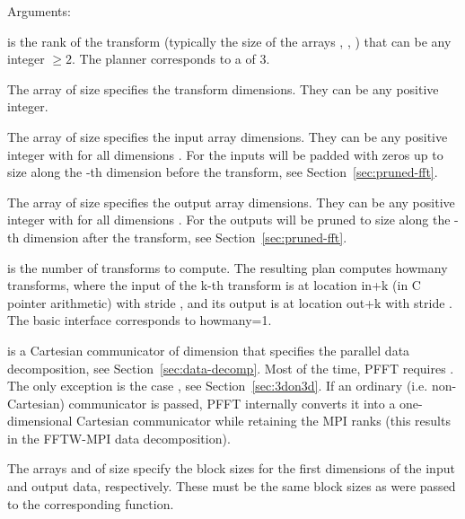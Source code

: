 Arguments:
\begin{compactitem}
  \item {} is the rank of the transform (typically the size of the arrays , , ) that can be any integer $\ge 2$.
        The  planner corresponds to a  of 3.
  \item The array  of size  specifies the transform dimensions. They can be any positive integer.
  \item The array  of size  specifies the input array dimensions.
        They can be any positive integer with  for all dimensions .
        For  the inputs will be padded with zeros up to size  along the -th dimension before the transform, see Section~\ref{sec:pruned-fft}.
  \item The array  of size  specifies the output array dimensions.
        They can be any positive integer with  for all dimensions .
        For  the outputs will be pruned to size  along the -th dimension after the transform, see Section~\ref{sec:pruned-fft}.
  \item {} is the number of transforms to compute. The resulting plan computes howmany transforms, 
        where the input of the k-th transform is at location in+k (in C pointer arithmetic) with stride ,
        and its output is at location out+k with stride .
        The basic  interface corresponds to howmany=1.
  \item {} is a Cartesian communicator of dimension  that specifies the parallel data decomposition, see Section~\ref{sec:data-decomp}.
        Most of the time, PFFT requires . The only exception is the case , see Section~\ref{sec:3don3d}.
        If an ordinary (i.e. non-Cartesian) communicator is passed, PFFT internally converts it into a one-dimensional Cartesian communicator while retaining the MPI ranks
        (this results in the FFTW-MPI data decomposition).
  \item The arrays  and  of size  specify the block sizes for the first  dimensions 
        of the input and output data, respectively. These must be the same block sizes as were passed to the corresponding  function.

\end{compactitem}
